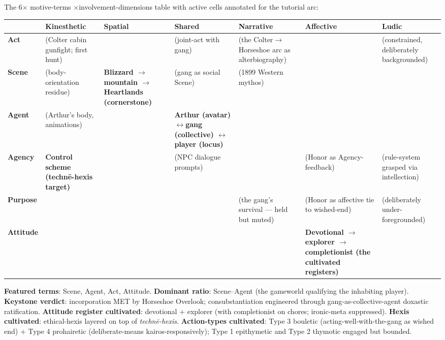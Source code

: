 \documentclass[11pt]{report}
\begin{document}
The 6$\times$ motive-terms $\times$\allowbreak  involvement-dimensions table with active cells annotated for the tutorial arc:


\begin{table}[H]
\scriptsize
\setlength{\tabcolsep}{3pt}
\renewcommand{\arraystretch}{1.25}
\begin{tabularx}{\textwidth}{>{\RaggedRight\arraybackslash}X>{\RaggedRight\arraybackslash}X>{\RaggedRight\arraybackslash}X>{\RaggedRight\arraybackslash}X>{\RaggedRight\arraybackslash}X>{\RaggedRight\arraybackslash}X>{\RaggedRight\arraybackslash}X}
\toprule
 & Kinesthetic & Spatial & Shared & Narrative & Affective & Ludic \\
\midrule
\textbf{Act} & (Colter cabin gunfight; first hunt) &  & (joint-act with gang) & (the Colter$\rightarrow$\allowbreak Horseshoe arc as alterbiography) &  & (constrained, deliberately backgrounded) \\
\textbf{Scene} & (body-orientation residue) & \textbf{Blizzard $\rightarrow$\allowbreak  mountain $\rightarrow$\allowbreak  Heartlands (cornerstone)} & (gang as social Scene) & (1899 Western mythos) &  &  \\
\textbf{Agent} & (Arthur's body, animations) &  & \textbf{Arthur (avatar) $\leftrightarrow$\allowbreak  gang (collective) $\leftrightarrow$\allowbreak  player (locus)} &  &  &  \\
\textbf{Agency} & \textbf{Control scheme (technē-hexis target)} &  & (NPC dialogue prompts) &  & (Honor as Agency-feedback) & (rule-system grasped via intellection) \\
\textbf{Purpose} &  &  &  & (the gang's survival — held but muted) & (Honor as affective tie to wished-end) & (deliberately under-foregrounded) \\
\textbf{Attitude} &  &  &  &  & \textbf{Devotional $\rightarrow$\allowbreak  explorer $\rightarrow$\allowbreak  completionist (the cultivated registers)} &  \\
\bottomrule
\end{tabularx}
\end{table}


\textbf{Featured terms}: Scene, Agent, Act, Attitude. \textbf{Dominant ratio}: Scene–Agent (the gameworld qualifying the inhabiting player). \textbf{Keystone verdict}: incorporation MET by Horseshoe Overlook; consubstantiation engineered through gang-as-collective-agent doxastic ratification. \textbf{Attitude register cultivated}: devotional + explorer (with completionist on chores; ironic-meta suppressed). \textbf{Hexis cultivated}: ethical-hexis layered on top of \textit{technē-hexis}. \textbf{Action-types cultivated}: Type 3 bouletic (acting-well-with-the-gang as wished end) + Type 4 prohairetic (deliberate-means kairos-responsively); Type 1 epithymetic and Type 2 thymotic engaged but bounded.
\end{document}
